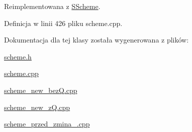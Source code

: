 Reimplementowana z \hyperlink{class_s_scheme_ae1e554b35ec2d8a902f6fdb30d95ab20}{S\+Scheme}.



Definicja w linii 426 pliku scheme.\+cpp.



Dokumentacja dla tej klasy została wygenerowana z plików\+:\begin{DoxyCompactItemize}
\item 
\hyperlink{scheme_8h}{scheme.\+h}\item 
\hyperlink{scheme_8cpp}{scheme.\+cpp}\item 
\hyperlink{scheme__new__bez_q_8cpp}{scheme\+\_\+new\+\_\+bez\+Q.\+cpp}\item 
\hyperlink{scheme__new__z_q_8cpp}{scheme\+\_\+new\+\_\+z\+Q.\+cpp}\item 
\hyperlink{scheme__przed__zmina__09092015_8cpp}{scheme\+\_\+przed\+\_\+zmina\+\_.\+cpp}\end{DoxyCompactItemize}
